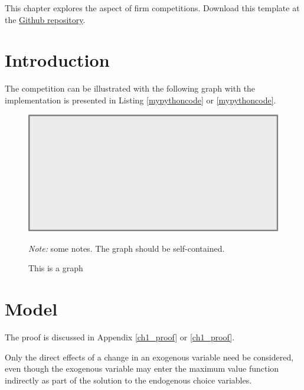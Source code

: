 This chapter explores the aspect of firm competitions. \lipsum[11] \lipsum[11]Download this template at the \href{https://github.com/howardhsumail/Dissertation-LaTeX-Template.git}{Github repository}.

\section{Introduction}

The {\color{mycolor}competition} can be illustrated with the following graph with the implementation is presented in Listing \ref{mypythoncode} or \cref{mypythoncode}. \lipsum[14]

\begin{figure}[H]
  \centering
  \caption{This is a graph}
  \includegraphics[scale=0.5]{Graph/pic.pdf}
  \hspace*{-0.6cm}
  \begin{minipage}{0.9\textwidth}
    \onehalfspacing
    \vspace*{0.12cm}
    \begin{tablenotes}
      \footnotesize
      \item\textit{Note:} some notes. The graph should be self-contained. \lipsum[66]
    \end{tablenotes}
  \end{minipage}
\end{figure}

\section{Model}
\lipsum[3-4] The proof is discussed in Appendix \ref{ch1_proof} or \cref{ch1_proof}.

\begin{theorem}
  Only the direct effects of a change in an exogenous variable need be considered, even though the exogenous variable may enter the maximum value function indirectly as part of the solution to the endogenous choice variables.
\end{theorem}


